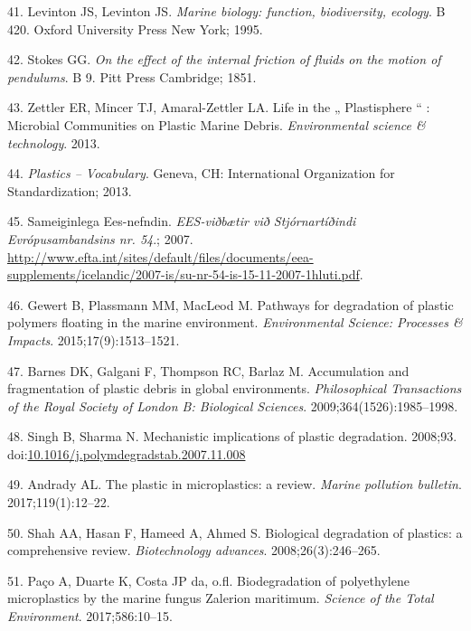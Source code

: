 \documentclass[icelandic,]{book}
\begin{document}
\leavevmode\hypertarget{ref-levinton1995marine}{}%
41. Levinton JS, Levinton JS. \emph{Marine biology: function, biodiversity, ecology}. B 420. Oxford University Press New York; 1995.

\leavevmode\hypertarget{ref-stokes1851effect}{}%
42. Stokes GG. \emph{On the effect of the internal friction of fluids on the motion of pendulums}. B 9. Pitt Press Cambridge; 1851.

\leavevmode\hypertarget{ref-Zettler2013}{}%
43. Zettler ER, Mincer TJ, Amaral-Zettler LA. Life in the „ Plastisphere `` : Microbial Communities on Plastic Marine Debris. \emph{Environmental science \& technology}. 2013.

\leavevmode\hypertarget{ref-ISO472}{}%
44. \emph{Plastics -- Vocabulary}. Geneva, CH: International Organization for Standardization; 2013.

\leavevmode\hypertarget{ref-SameiginlegaEes-nefndin2007}{}%
45. Sameiginlega Ees-nefndin. \emph{EES-viðbætir við Stjórnartíðindi Evrópusambandsins nr. 54}.; 2007. \url{http://www.efta.int/sites/default/files/documents/eea-supplements/icelandic/2007-is/su-nr-54-is-15-11-2007-1hluti.pdf}.

\leavevmode\hypertarget{ref-gewert2015pathways}{}%
46. Gewert B, Plassmann MM, MacLeod M. Pathways for degradation of plastic polymers floating in the marine environment. \emph{Environmental Science: Processes \& Impacts}. 2015;17(9):1513--1521.

\leavevmode\hypertarget{ref-barnes2009accumulation}{}%
47. Barnes DK, Galgani F, Thompson RC, Barlaz M. Accumulation and fragmentation of plastic debris in global environments. \emph{Philosophical Transactions of the Royal Society of London B: Biological Sciences}. 2009;364(1526):1985--1998.

\leavevmode\hypertarget{ref-Singh2008}{}%
48. Singh B, Sharma N. Mechanistic implications of plastic degradation. 2008;93. doi:\href{https://doi.org/10.1016/j.polymdegradstab.2007.11.008}{10.1016/j.polymdegradstab.2007.11.008}

\leavevmode\hypertarget{ref-andrady2017plastic}{}%
49. Andrady AL. The plastic in microplastics: a review. \emph{Marine pollution bulletin}. 2017;119(1):12--22.

\leavevmode\hypertarget{ref-shah2008biological}{}%
50. Shah AA, Hasan F, Hameed A, Ahmed S. Biological degradation of plastics: a comprehensive review. \emph{Biotechnology advances}. 2008;26(3):246--265.

\leavevmode\hypertarget{ref-pacco2017biodegradation}{}%
51. Paço A, Duarte K, Costa JP da, o.fl. Biodegradation of polyethylene microplastics by the marine fungus Zalerion maritimum. \emph{Science of the Total Environment}. 2017;586:10--15.
\end{document}

